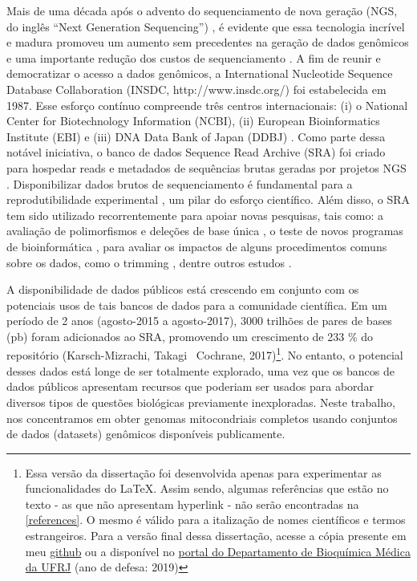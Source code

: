 \documentclass[../DISSERTACAO_MAIN.tex]{subfiles}
\begin{document}
Mais de uma década após o advento do sequenciamento de nova geração (NGS, do inglês “Next Generation Sequencing”) \cite{Margulies2005}, é evidente que essa tecnologia incrível e madura promoveu um aumento sem precedentes na geração de dados genômicos e uma importante redução dos custos de sequenciamento \cite{Mardis2008, Goodwin2016}. A fim de reunir e democratizar o acesso a dados genômicos, a International Nucleotide Sequence Database Collaboration (INSDC, http://www.insdc.org/) foi estabelecida em 1987. Esse esforço contínuo compreende três centros internacionais: (i) o National Center for Biotechnology Information (NCBI), (ii) European Bioinformatics Institute (EBI) e (iii) DNA Data Bank of Japan (DDBJ) \cite{Karsch-Mizrachi2018, Cochrane2006}. Como parte dessa notável iniciativa, o banco de dados Sequence Read Archive (SRA) foi criado para hospedar reads e metadados de sequências brutas geradas por projetos NGS \cite{Kodama2012}. Disponibilizar dados brutos de sequenciamento é fundamental para a reprodutibilidade experimental \cite{Stodden2018}, um pilar do esforço científico. Além disso, o SRA tem sido utilizado recorrentemente para apoiar novas pesquisas, tais como: a avaliação de polimorfismos e deleções de base única \cite{Bordbari2017}, o teste de novos programas de bioinformática \cite{Simpson2009, Langmead2012, Bolger2014}, para avaliar os impactos de alguns procedimentos comuns sobre os dados, como o trimming \cite{DelFabbro2013}, dentre outros estudos \cite{Kayal2015, Bernstein2017, Linard2018} .

A disponibilidade de dados públicos está crescendo em conjunto com os potenciais usos de tais bancos de dados para a comunidade científica. Em um período de 2 anos (agosto-2015 a agosto-2017), 3000 trilhões de pares de bases (pb) foram adicionados ao SRA, promovendo um crescimento de 233 \% do repositório  (Karsch-Mizrachi, Takagi \ Cochrane, 2017)\footnote{Essa versão da dissertação foi desenvolvida apenas para experimentar as funcionalidades do \LaTeX{}. Assim sendo, algumas referências que estão no texto -  as que não apresentam hyperlink - não serão encontradas na \autoref{references}. O mesmo é válido para a italização de nomes científicos e termos estrangeiros. Para a versão final dessa dissertação, acesse a cópia presente em meu \href{https://github.com/gavieira/apresentacoes/blob/master/DISSERTA\%C3\%87\%C3\%83O_GABRIEL_ALVES_VIEIRA.pdf}{github} ou a disponível no \href{http://www.bioqmed.ufrj.br/quimica-biologica/dissertacoes-e-teses}{portal  do Departamento de Bioquímica Médica da UFRJ} (ano de defesa: 2019)}. No entanto, o potencial desses dados está longe de ser totalmente explorado, uma vez que os bancos de dados públicos apresentam recursos que poderiam ser usados para abordar diversos tipos de questões biológicas previamente inexploradas. Neste trabalho, nos concentramos em obter genomas mitocondriais completos usando conjuntos de dados (datasets) genômicos disponíveis publicamente.
\end{document}
